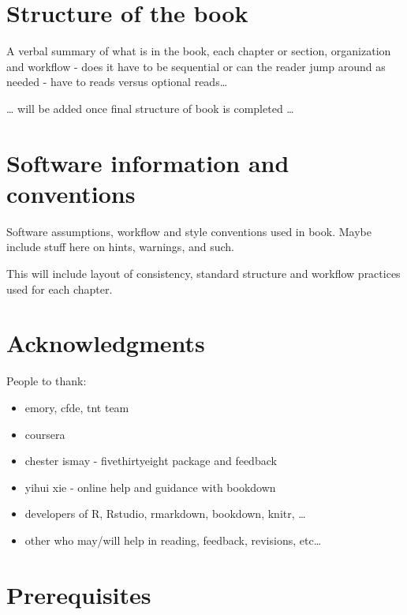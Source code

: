 \documentclass[
]{book}
\providecommand{\tightlist}{%
  \setlength{\itemsep}{0pt}\setlength{\parskip}{0pt}}
\begin{document}
\hypertarget{structure-of-the-book}{%
\section*{Structure of the book}\label{structure-of-the-book}}

A verbal summary of what is in the book, each chapter or section, organization and workflow - does it have to be sequential or can the reader jump around as needed - have to reads versus optional reads\ldots{}

\ldots{} will be added once final structure of book is completed \ldots{}

\hypertarget{software-information-and-conventions}{%
\section*{Software information and conventions}\label{software-information-and-conventions}}

Software assumptions, workflow and style conventions used in book. Maybe include stuff here on hints, warnings, and such.

This will include layout of consistency, standard structure and workflow practices used for each chapter.

\hypertarget{acknowledgments}{%
\section*{Acknowledgments}\label{acknowledgments}}

People to thank:

\begin{itemize}
\tightlist
\item
  emory, cfde, tnt team
\item
  coursera
\item
  chester ismay - fivethirtyeight package and feedback
\item
  yihui xie - online help and guidance with bookdown
\item
  developers of R, Rstudio, rmarkdown, bookdown, knitr, \ldots{}
\item
  other who may/will help in reading, feedback, revisions, etc\ldots{}
\end{itemize}

\hypertarget{prerequisites}{%
\section*{Prerequisites}\label{prerequisites}}
\end{document}
